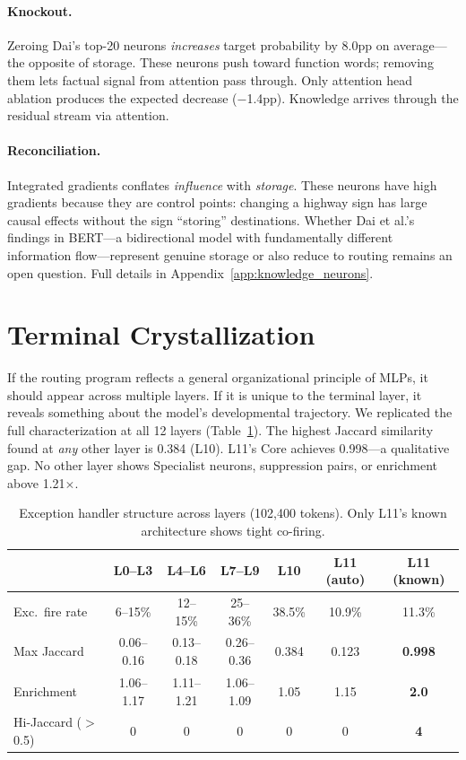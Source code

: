 \documentclass{article}
\begin{document}
\paragraph{Knockout.}
Zeroing Dai's top-20 neurons \emph{increases} target probability by 8.0pp on
average---the opposite of storage.
These neurons push toward function words; removing them lets factual signal
from attention pass through.
Only attention head ablation produces the expected decrease ($-$1.4pp).
Knowledge arrives through the residual stream via attention.

\paragraph{Reconciliation.}
Integrated gradients conflates \emph{influence} with \emph{storage}.
These neurons have high gradients because they are control points: changing
a highway sign has large causal effects without the sign ``storing''
destinations.
Whether Dai et al.'s findings in BERT---a bidirectional model with fundamentally
different information flow---represent genuine storage or also reduce to routing
remains an open question.
Full details in Appendix~\ref{app:knowledge_neurons}.

\section{Terminal Crystallization}
\label{sec:terminal}

If the routing program reflects a general organizational principle of MLPs,
it should appear across multiple layers.
If it is unique to the terminal layer, it reveals something about the model's
developmental trajectory.
We replicated the full characterization at all 12 layers
(Table~\ref{tab:cross_layer}).
The highest Jaccard similarity found at \emph{any} other layer is 0.384 (L10).
L11's Core achieves 0.998---a qualitative gap.
No other layer shows Specialist neurons, suppression pairs, or enrichment
above 1.21$\times$.

\begin{table}[t]
\centering
\caption{Exception handler structure across layers (102{,}400 tokens).
Only L11's known architecture shows tight co-firing.}
\label{tab:cross_layer}
\small
\begin{tabular}{@{}lcccccc@{}}
\toprule
 & L0--L3 & L4--L6 & L7--L9 & L10 & L11 (auto) & L11 (known) \\
\midrule
Exc.\ fire rate & 6--15\% & 12--15\% & 25--36\% & 38.5\% & 10.9\% & 11.3\% \\
Max Jaccard     & 0.06--0.16 & 0.13--0.18 & 0.26--0.36 & 0.384 & 0.123 & \textbf{0.998} \\
Enrichment      & 1.06--1.17 & 1.11--1.21 & 1.06--1.09 & 1.05 & 1.15 & \textbf{2.0} \\
Hi-Jaccard ($>$0.5) & 0 & 0 & 0 & 0 & 0 & \textbf{4} \\
\bottomrule
\end{tabular}
\end{table}
\end{document}
